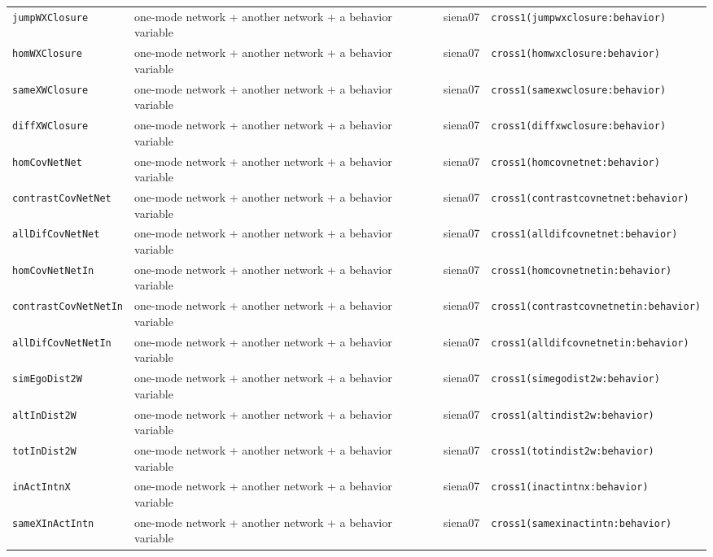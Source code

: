 \begin{longtable}{@{}p{2.6cm}p{3.2cm}p{2.9cm}p{5.4cm}@{}}
\texttt{jumpWXClosure} & one-mode network + another network + a behavior variable & siena07 & \texttt{cross1(jumpwxclosure:behavior)}\\
\texttt{homWXClosure} & one-mode network + another network + a behavior variable & siena07 & \texttt{cross1(homwxclosure:behavior)}\\
\texttt{sameXWClosure} & one-mode network + another network + a behavior variable & siena07 & \texttt{cross1(samexwclosure:behavior)}\\
\texttt{diffXWClosure} & one-mode network + another network + a behavior variable & siena07 & \texttt{cross1(diffxwclosure:behavior)}\\
\texttt{homCovNetNet} & one-mode network + another network + a behavior variable & siena07 & \texttt{cross1(homcovnetnet:behavior)}\\
\texttt{contrastCovNetNet} & one-mode network + another network + a behavior variable & siena07 & \texttt{cross1(contrastcovnetnet:behavior)}\\
\texttt{allDifCovNetNet} & one-mode network + another network + a behavior variable & siena07 & \texttt{cross1(alldifcovnetnet:behavior)}\\
\texttt{homCovNetNetIn} & one-mode network + another network + a behavior variable & siena07 & \texttt{cross1(homcovnetnetin:behavior)}\\
\texttt{contrastCovNetNetIn} & one-mode network + another network + a behavior variable & siena07 & \texttt{cross1(contrastcovnetnetin:behavior)}\\
\texttt{allDifCovNetNetIn} & one-mode network + another network + a behavior variable & siena07 & \texttt{cross1(alldifcovnetnetin:behavior)}\\
\texttt{simEgoDist2W} & one-mode network + another network + a behavior variable & siena07 & \texttt{cross1(simegodist2w:behavior)}\\
\texttt{altInDist2W} & one-mode network + another network + a behavior variable & siena07 & \texttt{cross1(altindist2w:behavior)}\\
\texttt{totInDist2W} & one-mode network + another network + a behavior variable & siena07 & \texttt{cross1(totindist2w:behavior)}\\
\texttt{inActIntnX} & one-mode network + another network + a behavior variable & siena07 & \texttt{cross1(inactintnx:behavior)}\\
\texttt{sameXInActIntn} & one-mode network + another network + a behavior variable & siena07 & \texttt{cross1(samexinactintn:behavior)}\\

\end{longtable}
